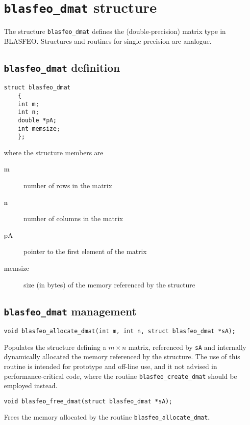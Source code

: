 \documentclass[a4paper]{report}
\begin{document}
\section{{\tt blasfeo\_dmat} structure}

The structure {\tt blasfeo\_dmat} defines the (double-precision) matrix type in BLASFEO.
Structures and routines for single-precision are analogue.



\subsection{{\tt blasfeo\_dmat} definition}

\begin{verbatim}
struct blasfeo_dmat 
    {
    int m;
    int n;
    double *pA;
    int memsize;
    };
\end{verbatim}
where the structure members are
\begin{description}
\item[m] number of rows in the matrix
\item[n] number of columns in the matrix
\item[pA] pointer to the first element of the matrix
\item[memsize] size (in bytes) of the memory referenced by the structure
\end{description}



\subsection{{\tt blasfeo\_dmat} management}

\begin{verbatim}
void blasfeo_allocate_dmat(int m, int n, struct blasfeo_dmat *sA);
\end{verbatim}
Populates the structure defining a $m\times n$ matrix, referenced by {\tt sA} and internally dynamically allocated the memory referenced by the structure.
The use of this routine is intended for prototype and off-line use, and it not advised in performance-critical code, where the routine {\tt blasfeo\_create\_dmat} should be employed instead.

\begin{verbatim}
void blasfeo_free_dmat(struct blasfeo_dmat *sA);
\end{verbatim}
Frees the memory allocated by the routine {\tt blasfeo\_allocate\_dmat}.
\end{document}
